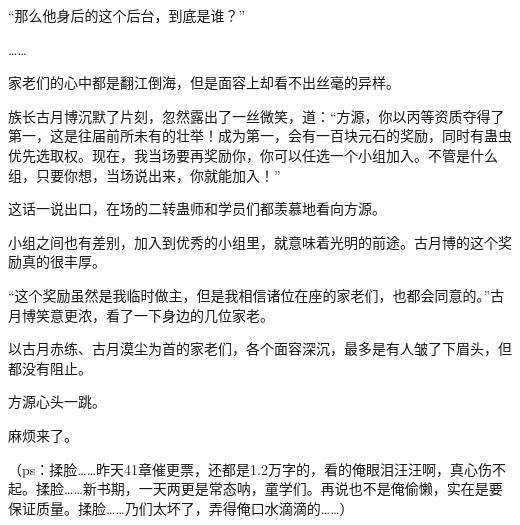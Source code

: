 \begin{this_body}
“那么他身后的这个后台，到底是谁？”

……

家老们的心中都是翻江倒海，但是面容上却看不出丝毫的异样。

族长古月博沉默了片刻，忽然露出了一丝微笑，道：“方源，你以丙等资质夺得了第一，这是往届前所未有的壮举！成为第一，会有一百块元石的奖励，同时有蛊虫优先选取权。现在，我当场要再奖励你，你可以任选一个小组加入。不管是什么组，只要你想，当场说出来，你就能加入！”

这话一说出口，在场的二转蛊师和学员们都羡慕地看向方源。

小组之间也有差别，加入到优秀的小组里，就意味着光明的前途。古月博的这个奖励真的很丰厚。

“这个奖励虽然是我临时做主，但是我相信诸位在座的家老们，也都会同意的。”古月博笑意更浓，看了一下身边的几位家老。

以古月赤练、古月漠尘为首的家老们，各个面容深沉，最多是有人皱了下眉头，但都没有阻止。

方源心头一跳。

麻烦来了。

（ps：揉脸……昨天41章催更票，还都是1.2万字的，看的俺眼泪汪汪啊，真心伤不起。揉脸……新书期，一天两更是常态呐，童学们。再说也不是俺偷懒，实在是要保证质量。揉脸……乃们太坏了，弄得俺口水滴滴的……）

\end{this_body}

